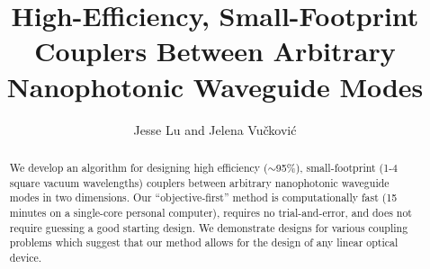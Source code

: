 \documentclass[letterpaper,10pt]{article}
\begin{document}
\title{High-Efficiency, Small-Footprint Couplers Between 
    Arbitrary Nanophotonic Waveguide Modes}
\author{Jesse Lu and Jelena Vu\v{c}kovi\'{c}}
\address{Stanford University, Stanford, California, USA.}

\maketitle
\begin{abstract}
We develop an algorithm for designing
    high efficiency ($\sim$95\%), 
    small-footprint (1-4 square vacuum wavelengths)
    couplers between arbitrary nanophotonic waveguide modes
    in two dimensions.
Our ``objective-first'' method is
    computationally fast (15 minutes on a single-core personal computer), 
    requires no trial-and-error, and
    does not require guessing a good starting design.
We demonstrate designs for various coupling problems which suggest 
    that our method allows for the design of any linear optical device.
\end{abstract}
\end{document}
